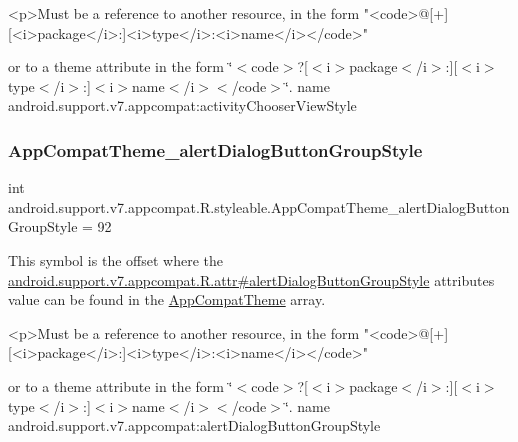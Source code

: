 \begin{DoxyVerb}      <p>Must be a reference to another resource, in the form "<code>@[+][<i>package</i>:]<i>type</i>:<i>name</i></code>"
\end{DoxyVerb}
 or to a theme attribute in the form \char`\"{}$<$code$>$?\mbox{[}$<$i$>$package$<$/i$>$\+:\mbox{]}\mbox{[}$<$i$>$type$<$/i$>$\+:\mbox{]}$<$i$>$name$<$/i$>$$<$/code$>$\char`\"{}.  name android.\+support.\+v7.\+appcompat\+:activity\+Chooser\+View\+Style \mbox{\label{classandroid_1_1support_1_1v7_1_1appcompat_1_1R_1_1styleable_a2887029a2a12510cb561a99124ec7bdf}} 
\subsubsection{\texorpdfstring{App\+Compat\+Theme\+\_\+alert\+Dialog\+Button\+Group\+Style}{AppCompatTheme\_alertDialogButtonGroupStyle}}
{\footnotesize\ttfamily int android.\+support.\+v7.\+appcompat.\+R.\+styleable.\+App\+Compat\+Theme\+\_\+alert\+Dialog\+Button\+Group\+Style = 92\hspace{0.3cm}{\ttfamily [static]}}

This symbol is the offset where the \hyperlink{classandroid_1_1support_1_1v7_1_1appcompat_1_1R_1_1attr_aaa6f31eaee143e1e1907c80497272f38}{android.\+support.\+v7.\+appcompat.\+R.\+attr\#alert\+Dialog\+Button\+Group\+Style} attribute\textquotesingle{}s value can be found in the \hyperlink{classandroid_1_1support_1_1v7_1_1appcompat_1_1R_1_1styleable_a5c42f89e8a410c323be34208d75c430b}{App\+Compat\+Theme} array.

\begin{DoxyVerb}      <p>Must be a reference to another resource, in the form "<code>@[+][<i>package</i>:]<i>type</i>:<i>name</i></code>"
\end{DoxyVerb}
 or to a theme attribute in the form \char`\"{}$<$code$>$?\mbox{[}$<$i$>$package$<$/i$>$\+:\mbox{]}\mbox{[}$<$i$>$type$<$/i$>$\+:\mbox{]}$<$i$>$name$<$/i$>$$<$/code$>$\char`\"{}.  name android.\+support.\+v7.\+appcompat\+:alert\+Dialog\+Button\+Group\+Style \mbox{\label{classandroid_1_1support_1_1v7_1_1appcompat_1_1R_1_1styleable_a3cc8519bf3de53533dfa7fdce1db7bc7}} 
